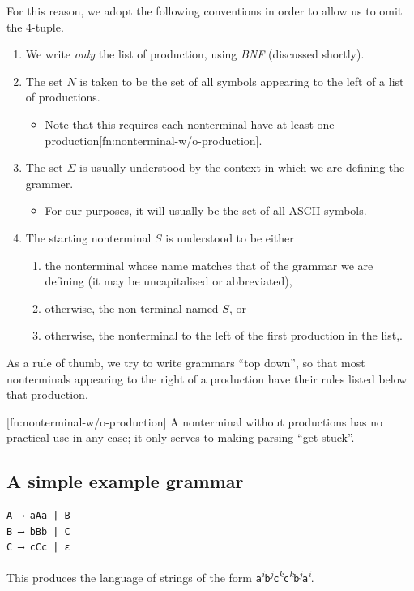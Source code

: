 \documentclass[11pt]{article}
\theoremstyle{definition}
\begin{document}
For this reason, we adopt the following conventions
in order to allow us to omit the 4-tuple.
\begin{enumerate}
\item We write \emph{only} the list of production,
using \emph{BNF} (discussed shortly).
\item The set \(N\) is taken to be the set of all symbols
appearing to the left of a list of productions.
\begin{itemize}
\item Note that this requires each nonterminal have
at least one production[fn:nonterminal-w/o-production].
\end{itemize}
\item The set \(Σ\) is usually understood by the context
in which we are defining the grammer.
\begin{itemize}
\item For our purposes, it will usually be the set of
all ASCII symbols.
\end{itemize}
\item The starting nonterminal \(S\) is understood to be either
\begin{enumerate}
\item the nonterminal whose name matches that of the grammar
we are defining (it may be uncapitalised or abbreviated),
\item otherwise, the non-terminal named \(S\), or
\item otherwise, the nonterminal to the left of
the first production in the list,.
\end{enumerate}
\end{enumerate}

As a rule of thumb, we try to write grammars “top down”,
so that most nonterminals appearing to the right of a production
have their rules listed below that production.

[fn:nonterminal-w/o-production]
A nonterminal without productions has no practical use in any case;
it only serves to making parsing “get stuck”.

\subsection{A simple example grammar}
\label{sec:org00df0d1}

\begin{verbatim}
A ⟶ aAa | B
B ⟶ bBb | C
C ⟶ cCc | ε
\end{verbatim}

This produces the language of strings of
the form \texttt{a}\textsuperscript{\emph{i}}\texttt{b}\textsuperscript{\emph{j}}\texttt{c}\textsuperscript{\emph{k}}\texttt{c}\textsuperscript{\emph{k}}\texttt{b}\textsuperscript{\emph{j}}\texttt{a}\textsuperscript{\emph{i}}.
\end{document}
